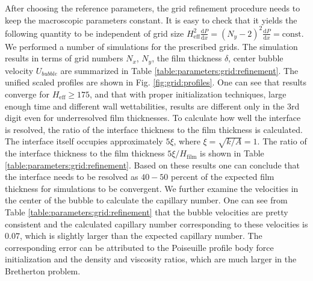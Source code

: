 \documentclass[preprint,12pt]{elsarticle}
\begin{document}
After choosing the reference parameters, the grid refinement procedure
needs to keep the macroscopic parameters constant.  It is easy to check
that it yields the following quantity to
be independent of grid size
$H_{\mathrm{eff}}^2\frac{\mathrm{d}P}{\mathrm{d}x}=(N_y-2)^2\frac{\mathrm{d}P}{\mathrm{d}
x } = \mathrm{const}$. We performed a number of simulations for the prescribed grids. The
simulation results in terms of grid numbers $N_x$, $N_y$, the film thickness $\delta$, center bubble
velocity $U_{bubble}$ are summarized in Table \ref{table:parameters:grid:refinement}.
The unified scaled profiles are shown in Fig. \ref{fig:grid:profiles}. One can
see that results converge for $H_{\mathrm{eff}}\geq 175$, and that with proper
initialization techniques, large enough time and different wall
wettabilities, results are different only in the 3rd digit even for
underresolved film thicknesses. To calculate how well the interface is
resolved, the ratio of the interface thickness to the film thickness is calculated. The
interface itself occupies approximately $5 \xi$, where
$\xi=\sqrt{k/A}=1$. The ratio of the interface thickness to the film thickness
$5\xi/H_{\mathrm{film}}$
 is shown in Table \ref{table:parameters:grid:refinement}. Based on these results one can conclude that
 the interface needs to be resolved as $40-50$ percent of the
expected film thickness for simulations to be convergent. We further examine the
velocities in the center of the bubble to calculate the capillary number. One can see from Table
\ref{table:parameters:grid:refinement} that the bubble velocities are pretty consistent and the
calculated capillary number corresponding to these velocities is $0.07$, which is slightly
larger than the expected capillary number. The corresponding error can be
attributed to the Poiseuille profile body force initialization and the
 density and viscosity ratios, which are much larger in the
Bretherton problem.
\end{document}
